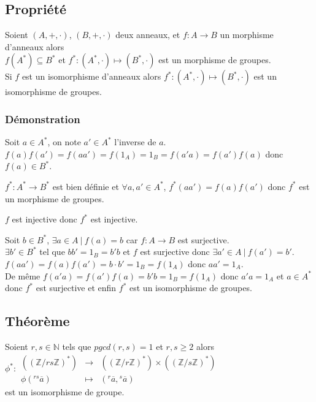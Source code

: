 \documentclass[a4paper,10pt]{book} %
\newcommand{\N}{\mathbb{N}}
\newcommand{\Z}{\mathbb{Z}}
\newcommand{\tq}{~|~}
\begin{document}
\newpage

\subsection{Propriété}
Soient $(A,+,\cdot)$, $(B,+,\cdot)$ deux anneaux, et $f:A\rightarrow B$ un morphisme d'anneaux alors\\$f(A^*)\subseteq B^*$ et $f^*:(A^*,\cdot)\mapsto (B^*,\cdot)$ est un morphisme de groupes.\\

Si $f$ est un isomorphisme d'anneaux alors $f^*:(A^*,\cdot)\mapsto (B^*,\cdot)$ est un isomorphisme de groupes.

\subsubsection{Démonstration}
Soit $a\in A^*$, on note $a'\in A^*$ l'inverse de $a$.\\ $f(a)f(a')=f(aa')=f(1_A)=1_B=f(a'a)=f(a')f(a)$ donc $f(a)\in B^*$.\smallskip

$f^* : A^*\rightarrow B^*$ est bien définie et $\forall a,a'\in A^*$, $f^*(aa')=f(a)f(a')$ donc $f^*$ est un morphisme de groupes.\smallskip

$f$ est injective donc $f^*$ est injective.\smallskip

Soit $b\in B^*$, $\exists a\in A \tq f(a)=b$ car $f: A\rightarrow B$ est surjective.\\
$\exists b'\in B^*$ tel que $bb'=1_B=b'b$ et $f$ est surjective donc $\exists a'\in A \tq f(a') = b'$.\\
$f(aa') = f(a)f(a')= b\cdot b' = 1_B=f(1_A)$ donc $aa'=1_A$.\\

De même $f(a'a) = f(a')f(a) = b'b=1_B = f(1_A)$ donc $a'a = 1_A$ et $a\in A^*$ donc $f^*$ est surjective et enfin $f^*$ est un isomorphisme de groupes.

\subsection{Théorème}
Soient $r,s\in \N$ tels que $pgcd(r,s)=1$ et $r,s\geq 2$ alors $\phi^* :\begin{array}{rcl} ((\Z/rs\Z)^*)&\rightarrow &((\Z/r\Z)^*)\times ((\Z/s\Z)^*)\\\phi({}^{rs}\overline{a})&\mapsto& ({}^{r}\overline{a},{}^{s}\overline{a})\end{array}$\\est un isomorphisme de groupe.
\end{document}
